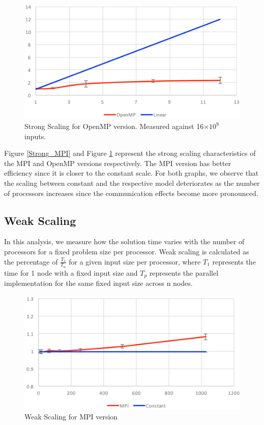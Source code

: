 \documentclass[11pt]{article}
\begin{document}
\begin{figure}[h!]
    \centering
        \includegraphics[scale=0.23]{Strong_OpenMP.jpg}
        \caption{Strong Scaling for OpenMP version. Measured against 16$\times10^{9}$ inputs.}
        \label{Strong_OpenMP}
    \centering
\end{figure}

Figure \ref{Strong_MPI} and Figure \ref{Strong_OpenMP} represent the strong scaling characteristics of the MPI and OpenMP versions respectively. The MPI version has better efficiency since it is closer to the constant scale. For both graphs, we observe that the scaling between constant and the respective model deteriorates as the number of processors increases since the communication effects become more pronounced. 

\subsection{Weak Scaling}

In this analysis, we measure how the solution time varies with the number of processors for a fixed problem size per processor. Weak scaling is calculated as the percentage of $\frac{T_{1}}{T_{n}}$ for a given input size per processor, where $T_{1}$ represents the time for 1 node with a fixed input size and $T_{p}$ represents the parallel implementation for the same fixed input size across n nodes.

\begin{figure}[h!]
    \centering
        \includegraphics[scale=0.218]{Weak_MPI.jpg}
        \caption{Weak Scaling for MPI version}
        \label{Weak_MPI}
    \centering
\end{figure}
\end{document}
